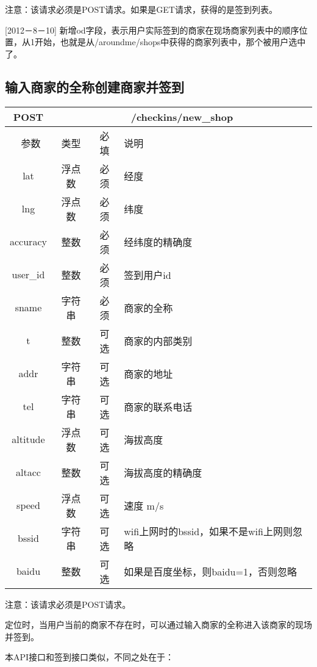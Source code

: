 \documentclass[cs4size]{ctexartutf8}
\begin{document}
注意：该请求必须是POST请求。如果是GET请求，获得的是签到列表。

[2012－8－10] 新增od字段，表示用户实际签到的商家在现场商家列表中的顺序位置，从1开始，也就是从/aroundme/shops中获得的商家列表中，那个被用户选中了。



\subsection{输入商家的全称创建商家并签到}

\begin{table}[H]
   \begin{center}
\begin{tabular}{|c|c|c|p{12cm}|}
\hline
POST & \multicolumn{3}{|c|}{/checkins/new\_shop} \\
\hline\hline
 \  参数  & 类型 & 必填 &  说明  \\
\hline
 lat  & 浮点数 & 必须 & 经度\\
\hline
 lng  &  浮点数 & 必须 & 纬度\\ 
\hline
 accuracy  & 整数 & 必须 & 经纬度的精确度\\ 
\hline
 user\_id  & 整数 & 必须 &  签到用户id\\ 
\hline
 sname  & 字符串 & 必须 &  商家的全称\\  
\hline
 t  & 整数 & 可选 &  商家的内部类别\\    
\hline
 addr  & 字符串 & 可选 &  商家的地址\\   
 \hline
 tel  & 字符串 & 可选 &  商家的联系电话\\    
\hline
 altitude  &  浮点数 & 可选 & 海拔高度\\ 
\hline
 altacc  & 整数 & 可选 & 海拔高度的精确度\\  
 \hline
 speed  & 浮点数 & 可选 & 速度 m/s\\   
\hline
 bssid  & 字符串 & 可选 & wifi上网时的bssid，如果不是wifi上网则忽略\\  
 \hline
 baidu  & 整数 & 可选 & 如果是百度坐标，则baidu=1，否则忽略\\  
\hline
\end{tabular}
   \end{center}
\end{table}

注意：该请求必须是POST请求。

定位时，当用户当前的商家不存在时，可以通过输入商家的全称进入该商家的现场并签到。

本API接口和签到接口类似，不同之处在于：
\end{document}
